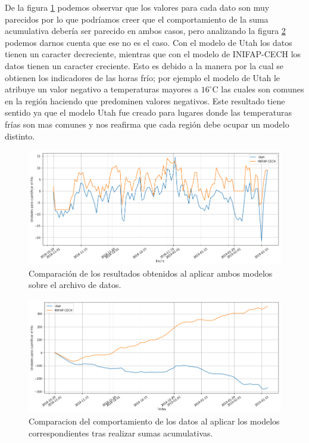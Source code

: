 \documentclass[12pt]{article}
\begin{document}
De la figura \ref{fig:plot} podemos observar que los valores para cada dato son muy parecidos por lo que podríamos creer que el comportamiento de la suma acumulativa debería ser parecido en ambos casos, pero analizando la figura \ref{fig:cumsum} podemos darnos cuenta que ese no es el caso. Con el modelo de Utah los datos tienen un caracter decreciente, mientras que con el modelo de INIFAP-CECH los datos tienen un caracter creciente. Esto es debido a la manera por la cual se obtienen los indicadores de las horas frío; por ejemplo el modelo de Utah le atribuye un valor negativo a temperaturas mayores a $16^\circ$C las cuales son comunes en la región haciendo que predominen valores negativos. Este resultado tiene sentido ya que el modelo Utah fue creado para lugares donde las temperaturas frías son mas comunes y nos reafirma que cada región debe ocupar un modelo distinto.

\begin{figure}
    \centering
    \includegraphics[scale = .4]{plot.png}
    \caption{Comparaci\'on de los resultados obtenidos al aplicar ambos modelos sobre el archivo de datos.}
    \label{fig:plot}
\end{figure}

\begin{figure}
    \centering
    \includegraphics[scale = .4]{cumsum.png}
    \caption{Comparacion del comportamiento de los datos al aplicar los modelos correspondientes tras realizar sumas acumulativas.}
    \label{fig:cumsum}
\end{figure}
\end{document}
